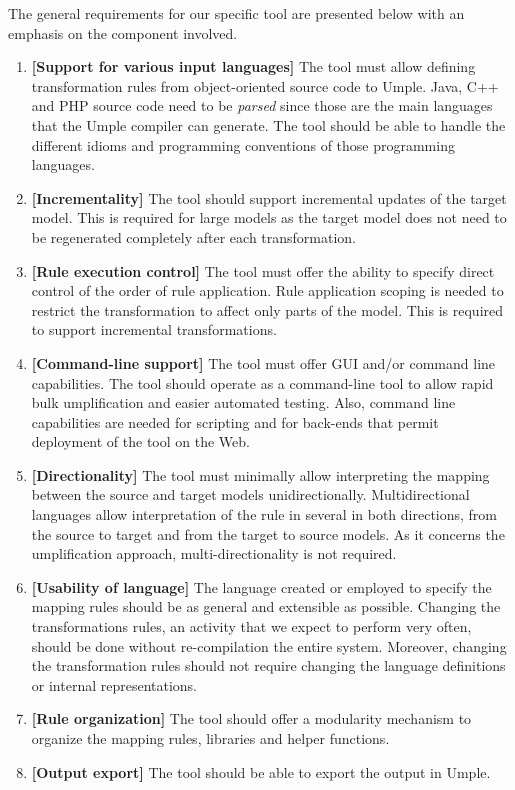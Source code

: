 The general requirements for our specific tool are presented below with an emphasis on the component involved.

\begin{enumerate}
\item \textbf{[Support for various input languages]} The tool must allow defining transformation rules from object-oriented source code to Umple. Java, C++ and PHP source code need to be \textit{parsed} since those are the main languages that the Umple compiler can generate. The tool should be able to handle the different idioms and programming conventions of those programming languages.

\item \textbf{[Incrementality]} The tool should support incremental updates of the target model. This is required for large models as the target model does not need to be regenerated completely after each transformation. 

\item \textbf{[Rule execution control]} The tool must offer the ability to specify direct control of the order of rule application. Rule application scoping is needed to restrict the transformation to affect only parts of the model. This is required to support incremental transformations.

\item \textbf{[Command-line support]} The tool must offer GUI and/or command line capabilities. The tool should operate as a command-line tool to allow rapid bulk umplification and easier automated testing. Also, command line capabilities are needed for scripting and for back-ends that permit deployment of the tool on the Web. 

\item \textbf{[Directionality]} The tool must minimally allow interpreting the mapping between the source and target models unidirectionally. Multidirectional languages allow interpretation of the rule in several in both directions, from the source to target and from the target to source models. As it concerns the umplification approach, multi-directionality is not required. 

\item \textbf{[Usability of language]} The language created or employed to specify the mapping rules should be as general and extensible as possible. Changing the transformations rules, an activity that we expect to perform very often, should be done without re-compilation the entire system. Moreover, changing the transformation rules should not require changing the language definitions or internal representations.
 
\item \textbf{[Rule organization]} The tool should offer a modularity mechanism to organize the mapping rules, libraries and helper functions. 

\item \textbf{[Output export]} The tool should be able to export the output in Umple. 
\end{enumerate}

